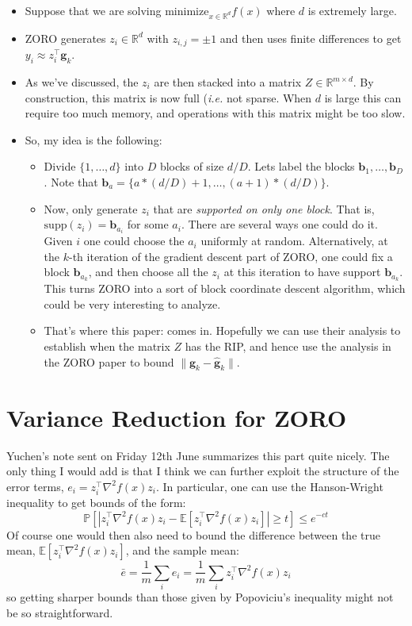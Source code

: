 \documentclass{article}
\begin{document}
\begin{itemize}
	\item Suppose that we are solving $\text{minimize}_{x\in\mathbb{R}^{d}} f(x)$ where $d$ is extremely large.
	\item ZORO generates $z_{i}\in\mathbb{R}^{d}$ with $z_{i,j} = \pm 1$ and then uses finite differences to get $y_{i} \approx z_{i}^{\top}\mathbf{g}_k$. 
	\item As we've discussed, the $z_i$ are then stacked into a matrix $Z\in\mathbb{R}^{m\times d}$. By construction, this matrix is now full ({\em i.e.} not sparse. When $d$ is large this can require too much memory, and operations with this matrix might be too slow.
	\item So, my idea is the following:
		\begin{itemize}
			\item Divide $\{1,\ldots, d\}$ into $D$ blocks of size $d/D$. Lets label the blocks $\mathbf{b}_{1},\ldots, \mathbf{b}_{D}$. Note that $\mathbf{b}_{a} = \{a*(d/D)+1,\ldots, (a+1)*(d/D)\}$. 
			\item Now, only generate $z_{i}$ that are {\em supported on only one block}. That is, $\text{supp}(z_i) = \mathbf{b}_{a_i}$ for some $a_i$. There are several ways one could do it. Given $i$ one could choose the $a_i$ uniformly at random. Alternatively, at the $k$-th iteration of the gradient descent part of ZORO, one could fix a block $\mathbf{b}_{a_{k}}$, and then choose all the $z_i$ at this iteration to have support $\mathbf{b}_{a_k}$. This turns ZORO into a sort of block coordinate descent algorithm, which could be very interesting to analyze.
			\item That's where this paper: \cite{chun2020uniform} comes in. Hopefully we can use their analysis to establish when the matrix $Z$ has the RIP, and hence use the analysis in the ZORO paper to bound $\|\mathbf{g}_k - \hat{\mathbf{g}}_k\|$. 
		
		\end{itemize}

\end{itemize}

\section{Variance Reduction for ZORO}

Yuchen's note sent on Friday 12th June summarizes this part quite nicely. The only thing I would add is that I think we can further exploit the structure of the error terms, $e_i = z_i^{\top}\nabla^{2}f(x)z_i$. In particular, one can use the Hanson-Wright inequality to get bounds of the form:
$$
\mathbb{P}\left[\left| z_i^{\top}\nabla^{2}f(x)z_i - \mathbb{E}\left[z_i^{\top}\nabla^{2}f(x)z_i\right]\right| \geq t \right] \leq e^{-ct} 
$$
Of course one would then also need to bound the difference between the true mean, $\mathbb{E}\left[z_i^{\top}\nabla^{2}f(x)z_i\right]$, and the sample mean:
$$
\bar{e} = \frac{1}{m}\sum_i e_i = \frac{1}{m} \sum_i z_i^{\top}\nabla^{2}f(x)z_i 
$$
so getting sharper bounds than those given by Popoviciu's inequality might not be so straightforward.


\end{document}
